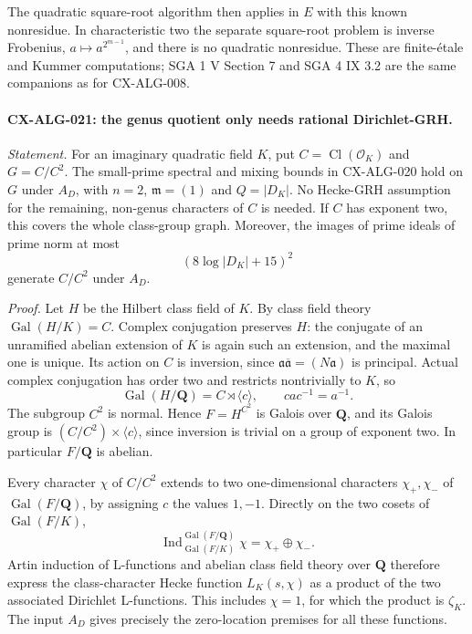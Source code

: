 The quadratic square-root algorithm then applies in $E$ with this known
nonresidue. In characteristic two the separate square-root problem is
inverse Frobenius, $a\mapsto a^{2^{m-1}}$, and there is no quadratic
nonresidue. These are finite-\'etale and Kummer computations; SGA 1 V
Section 7 and SGA 4 IX 3.2 are the same companions as for CX-ALG-008.

\paragraph{CX-ALG-021: the genus quotient only needs rational Dirichlet-GRH.}
\emph{Statement.} For an imaginary quadratic field $K$, put
$C=\operatorname{Cl}(\mathcal O_K)$ and $G=C/C^2$. The small-prime
spectral and mixing bounds in CX-ALG-020 hold on $G$ under $A_D$, with
$n=2$, $\mathfrak m=(1)$ and $Q=|D_K|$. No Hecke-GRH assumption for
the remaining, non-genus characters of $C$ is needed. If $C$ has exponent
two, this covers the whole class-group graph.
Moreover, the images of prime ideals of prime norm at most
\[
                         (8\log|D_K|+15)^2
\]
generate $C/C^2$ under $A_D$.

\emph{Proof.} Let $H$ be the Hilbert class field of $K$.
By class field theory $\operatorname{Gal}(H/K)=C$. Complex conjugation
preserves $H$: the conjugate of an unramified abelian extension of $K$
is again such an extension, and the maximal one is unique. Its action on
$C$ is inversion, since
$\mathfrak a\overline{\mathfrak a}=(N\mathfrak a)$ is principal.
Actual complex conjugation has order two and restricts nontrivially to
$K$, so
\[
       \operatorname{Gal}(H/\mathbf Q)=C\rtimes\langle c\rangle,
                    \qquad cac^{-1}=a^{-1}.
\]
The subgroup $C^2$ is normal. Hence $F=H^{C^2}$ is Galois over
$\mathbf Q$, and its Galois group is
$(C/C^2)\times\langle c\rangle$, since inversion is trivial on a group
of exponent two. In particular $F/\mathbf Q$ is abelian.

Every character $\chi$ of $C/C^2$ extends to two one-dimensional
characters $\chi_+,\chi_-$ of $\operatorname{Gal}(F/\mathbf Q)$, by
assigning $c$ the values $1,-1$. Directly on the two cosets of
$\operatorname{Gal}(F/K)$,
\[
       \operatorname{Ind}_{\operatorname{Gal}(F/K)}^{
                       \operatorname{Gal}(F/\mathbf Q)}\chi
                         =\chi_+\oplus\chi_-.
\]
Artin induction of L-functions and abelian class field theory over
$\mathbf Q$ therefore express the class-character Hecke function
$L_K(s,\chi)$ as a product of the two associated Dirichlet L-functions.
This includes $\chi=1$, for which the product is $\zeta_K$.
The input $A_D$ gives precisely the zero-location premises for all these
functions.

